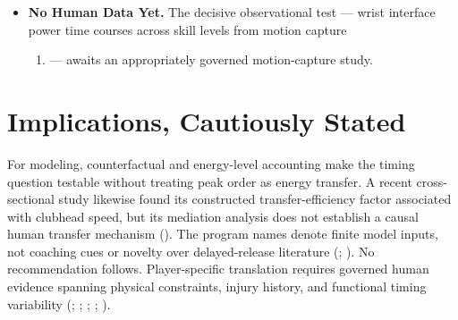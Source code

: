 \documentclass[
  letterpaper,
]{report}
\providecommand{\tightlist}{%
  \setlength{\itemsep}{0pt}\setlength{\parskip}{0pt}}
\begin{document}
\begin{itemize}
  same-state killswitches in the double-pendulum and constrained
  two-hand tiers. The coupled extension now preserves the finite
  negative-couple branch with endogenous base translation and club flex.
  The spatial common-state tier transports the geometry response across
  independent inverse-dynamics formulations. The reduced spatial forward
  tier then preserves a negative contact couple after complete driver
  removal under both native inertia-and-bias operators, with one shared
  projected contact law and state update. Its hand carriages and
  declared contact law do not establish persistence in anatomical arms
  or human dynamics.
\item
  \textbf{No Human Data Yet.} The decisive observational test --- wrist
  interface power time courses across skill levels from motion capture

  \begin{enumerate}
  \def\labelenumi{(\arabic{enumi})}
  \setcounter{enumi}{2}
  \tightlist
  \item
    --- awaits an appropriately governed motion-capture study.
  \end{enumerate}
\end{itemize}

\section{Implications, Cautiously
Stated}\label{sec-discussion-implications}

For modeling, counterfactual and energy-level accounting make the timing
question testable without treating peak order as energy transfer. A
recent cross-sectional study likewise found its constructed
transfer-efficiency factor associated with clubhead speed, but its
mediation analysis does not establish a causal human transfer mechanism
(). The
program names denote finite model inputs, not coaching cues or novelty
over delayed-release literature (; ). No
recommendation follows. Player-specific translation requires governed
human evidence spanning physical constraints, injury history, and
functional timing variability (; ;
;
;
).
\end{document}
